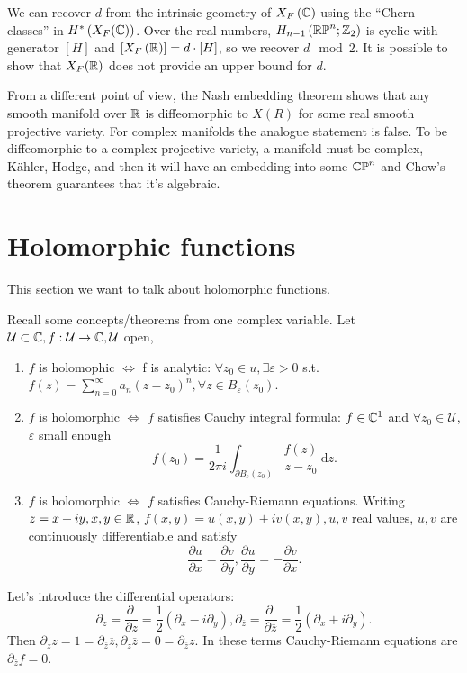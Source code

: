 We can recover $d$ from the intrinsic geometry of $X_F\left( \mathbb{C} \right) $ using the ``Chern classes'' in $H^{*}\left( X_F(\mathbb{C}) \right) $. Over the real numbers, $H_{n-1}\left( \mathbb{RP}^{n};\mathbb{Z}_2 \right) $ is cyclic with generator $\left[ H \right] $ and $\left[ X_F\left( \mathbb{R} \right)  \right] =d\cdot \left[ H \right] $, so we recover $d \mod 2$. 
It is possible to show that $X_F(\mathbb{R})$ does not provide an upper bound for $d$.

From a different point of view, the Nash embedding theorem shows that any smooth manifold over $\mathbb{R}$ is diffeomorphic to $X(R)$ for some real smooth projective variety.
For complex manifolds the analogue statement is false. To be diffeomorphic to a complex projective variety, a manifold must be complex, K\"{a}hler, Hodge, and then it will have an embedding into some $\mathbb{CP}^{n}$ and Chow's theorem guarantees that it's algebraic.

\section{Holomorphic functions}
This section we want to talk about holomorphic functions.

Recall some concepts/theorems from one complex variable. Let   $\mathcal{U}\subset \mathbb{C}, f:\mathcal{U}\to \mathbb{C}, \mathcal{U}$ open,
\begin{enumerate}
  \item $f$ is holomophic $\Leftrightarrow$ f is analytic: $\forall  z_0 \in  u, \exists \varepsilon >0$ s.t. $f(z)=\sum_{n=0}^{\infty} a_n (z-z_0)^n,\forall z\in B_{\varepsilon }(z_0)$.
  \item  $f$ is holomorphic $\Leftrightarrow$ $f$ satisfies Cauchy integral formula: $f\in \mathbb{C}^{1}$ and $\forall z_0 \in  \mathcal{U}$, $\varepsilon $ small enough 
    \[
      f(z_0)=\frac{1}{2\pi i}\int_{\partial B_\varepsilon (z_0)}\frac{ f(z)}{z-z_0}\,\mathrm{d}z.
    \] 
  \item $f$ is holomorphic $\Leftrightarrow$ $f$ satisfies Cauchy-Riemann equations. Writing $z=x+iy,x,y\in \mathbb{R}$, $f(x,y)=u(x,y)+iv(x,y), u,v$ real values, $u,v$ are continuously differentiable and satisfy
    \[
    \frac{\partial u}{\partial x} =\frac{\partial v}{\partial y},  \frac{\partial u}{\partial y} =-\frac{\partial v}{\partial x} . 
    \] 
\end{enumerate}

Let's introduce the differential operators:
\[
  \partial_z=\frac{\partial ~}{\partial z} =\frac{1}{2}\left( \partial_x-i\partial_y \right) ,\partial_{\overline{z}}=\frac{\partial ~}{\partial \overline{z}} =\frac{1}{2}\left( \partial_x+i\partial_y \right) .
\] 	
Then $\partial_z z=1=\partial_{\overline{z}}\overline{z},\partial_z\overline{z}=0=\partial_{\overline{z}}z$. In these terms Cauchy-Riemann equations are $\partial_{\overline{z}}f=0$.

